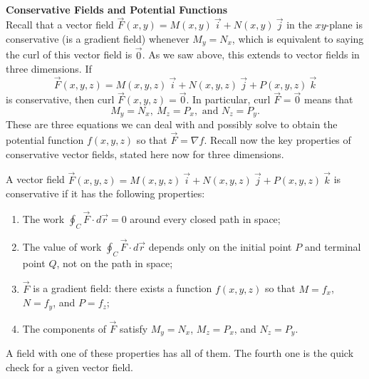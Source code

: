 \\

\noindent\textbf{\large Conservative Fields and Potential Functions}\\

Recall that a vector field $\vec F(x,y) = M(x,y) \: \vec i + N(x,y) \: \vec j$ in the $xy$-plane is conservative (is a gradient field) whenever $M_y = N_x$, which is equivalent to saying the curl of this vector field is $\vec 0$.  As we saw above, this extends to vector fields in three dimensions.  If $$\vec F(x,y,z) = M(x,y,z) \: \vec i + N(x,y,z) \: \vec j + P(x,y,z) \: \vec k$$ is conservative, then $\text{curl } \vec F(x,y,z) = \vec 0$.  In particular, $\text{curl } \vec F = \vec 0$ means that
$$M_y = N_x, \: M_z = P_x, \text{ and } N_z = P_y.$$
These are three equations we can deal with and possibly solve to obtain the potential function $f(x,y,z)$ so that $\vec F = \nabla f$.  Recall now the key properties of conservative vector fields, stated here now for three dimensions.\\

{A vector field $\vec F(x,y,z) = M(x,y,z) \: \vec i + N(x,y,z) \: \vec j + P(x,y,z) \: \vec k$ is conservative if it has the following properties:
\begin{enumerate}
	\item The work $\displaystyle\oint_C \vec F \cdot d\vec r = 0$ around every closed path in space;
	\item The value of work $\displaystyle\oint_C \vec F \cdot d\vec r$ depends only on the initial point $P$ and terminal point $Q$, not on the path in space;
	\item $\vec F$ is a gradient field: there exists a function $f(x,y,z)$ so that $M = f_x$, $N = f_y$, and $P = f_z$;
	\item The components of $\vec F$ satisfy $M_y = N_x$, $M_z = P_x$, and $N_z = P_y$.
\end{enumerate}
A field with one of these properties has all of them.  The fourth one is the quick check for a given vector field.
}\\

